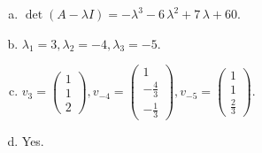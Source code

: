 \begin{questions}
\begin{solution}
\begin{enumerate}[(a)]
\item $\det(A-\lambda I)=-{\lambda}^{3} - 6 \, {\lambda}^{2} + 7 \, {\lambda} + 60$.
\item ${\lambda}_1=3, {\lambda}_2=-4, {\lambda}_3=-5$.
\item $v_{3}=\left(\begin{array}{r}
1 \\
1 \\
2
\end{array}\right), v_{-4}=\left(\begin{array}{r}
1 \\
-\frac{4}{3} \\
-\frac{1}{3}
\end{array}\right), v_{-5}=\left(\begin{array}{r}
1 \\
1 \\
\frac{2}{3}
\end{array}\right)$.
\item Yes.
\end{enumerate}
\end{solution}

\end{questions}

\newpage


\begin{center}
\end{center}

